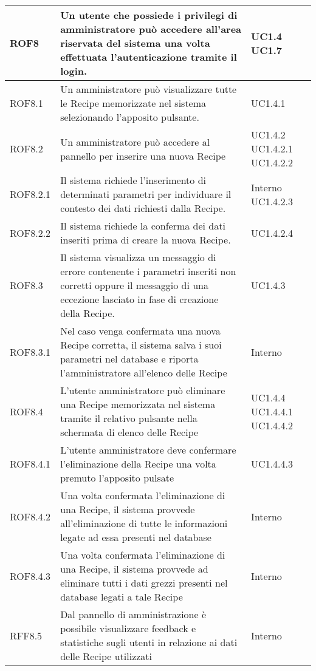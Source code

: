\begin{center}
\begin{longtable}{| p{2.5cm} | p{8cm} | p{2cm} |}
		ROF8  &  Un utente che possiede i privilegi di amministratore può accedere all'area riservata del sistema una volta effettuata l'autenticazione tramite il login.  &  UC1.4 \newline UC1.7 \\
		\hline
		ROF8.1  &  Un amministratore può visualizzare tutte le Recipe memorizzate nel sistema selezionando l'apposito pulsante.  &  UC1.4.1 \\
		\hline
		ROF8.2  &  Un amministratore può accedere al pannello per inserire una nuova Recipe  &  UC1.4.2 \newline UC1.4.2.1 \newline UC1.4.2.2  \\
		\hline
		ROF8.2.1  &  Il sistema richiede l'inserimento di determinati parametri per individuare il contesto dei dati richiesti dalla Recipe.  &  Interno \newline UC1.4.2.3 \\
		\hline
		ROF8.2.2  &  Il sistema richiede la conferma dei dati inseriti prima di creare la nuova Recipe.  &  UC1.4.2.4 \\
		\hline
		ROF8.3  &  Il sistema visualizza un messaggio di errore contenente i parametri inseriti non corretti oppure il messaggio di una eccezione lasciato in fase di creazione della Recipe.  &  UC1.4.3 \\
		\hline
		ROF8.3.1  &  Nel caso venga confermata  una nuova Recipe corretta, il sistema salva i suoi parametri nel database  e riporta l'amministratore all'elenco delle Recipe  &  Interno \\
		\hline
		ROF8.4  &  L'utente amministratore può eliminare una Recipe memorizzata nel sistema tramite il relativo pulsante nella schermata di elenco delle Recipe  &  UC1.4.4 \newline UC1.4.4.1 \newline UC1.4.4.2 \\
		\hline
		ROF8.4.1  &  L'utente amministratore deve confermare l'eliminazione della Recipe una volta premuto l'apposito pulsate  &  UC1.4.4.3 \\
		\hline
		ROF8.4.2  &  Una volta confermata l'eliminazione di una Recipe, il sistema provvede all'eliminazione di tutte le informazioni legate ad essa presenti nel database  &  Interno \\
		\hline
		ROF8.4.3  &  Una volta confermata l'eliminazione di una Recipe, il sistema provvede ad eliminare tutti i dati grezzi presenti nel database legati a tale Recipe  &  Interno \\
		\hline
		RFF8.5  &  Dal pannello di amministrazione è possibile visualizzare feedback e statistiche sugli utenti in relazione ai dati delle Recipe utilizzati  &  Interno \\
		\hline



\end{longtable}
\end{center}
